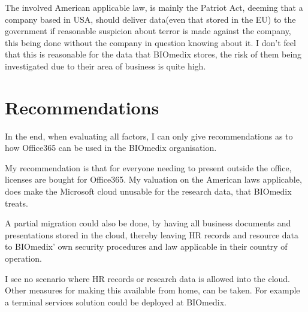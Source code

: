 \documentclass[paper=a4, fontsize=11pt]{scrartcl} %
\numberwithin{equation}{section} %
\numberwithin{figure}{section} %
\numberwithin{table}{section} %
\begin{document}
The involved American applicable law, is mainly the Patriot Act, deeming that a
company based in USA, should deliver data(even that stored in the EU) to the
government if reasonable suspicion about terror is made against the
company, this being done without the company in question knowing about it. I
don't feel that this is reasonable for the data that BIOmedix stores, the risk
of them being investigated due to their area of business is quite high.

\section{Recommendations}
In the end, when evaluating all factors, I can only give recommendations as to 
how Office365 can be used in the BIOmedix organisation.

My recommendation is that for everyone needing to present outside the office,
licenses are bought for Office365. My valuation on the American laws
applicable, does make the Microsoft cloud unusable for the research data, that
BIOmedix treats.

A partial migration could also be done, by having all business documents and 
presentations stored in the cloud, thereby leaving HR records and resource data
to BIOmedix' own security procedures and law applicable in their country of
operation.

I see no scenario where HR records or research data is allowed into the cloud.
Other measures for making this available from home, can be taken. For example a
terminal services solution could be deployed at BIOmedix.
\end{document}
